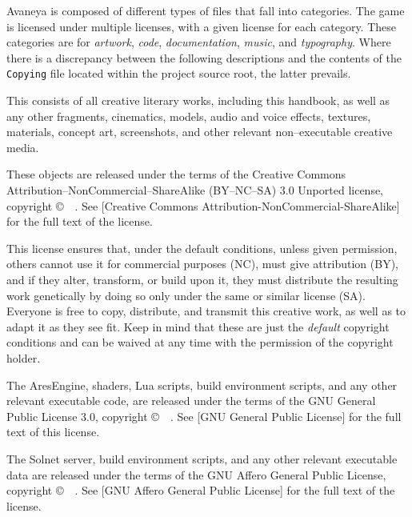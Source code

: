 

Avaneya is composed of different types of files that fall into categories. The game is licensed under multiple licenses, with a given license for each category. These categories are for {\it artwork}, {\it code}, {\it documentation}, {\it music}, and {\it typography}. Where there is a discrepancy between the following descriptions and the contents of the {\tt Copying} file located within the project source root, the latter prevails.

\startitemize[4]

This consists of all creative literary works, including this handbook, as well as any other fragments, cinematics, models, audio and voice effects, textures, materials, concept art, screenshots, and other relevant non--executable creative media. 

These objects are released under the terms of the Creative Commons Attribution--NonCommercial--ShareAlike (BY--NC--SA) 3.0 Unported license, copyright \copyright\ \CopyrightDates\ \CopyrightHolder. See [Creative Commons Attribution-NonCommercial-ShareAlike] for the full text of the license.

This license ensures that, under the default conditions, unless given permission, others cannot use it for commercial purposes (NC), must give attribution (BY), and if they alter, transform, or build upon it, they must distribute the resulting work genetically by doing so only under the same or similar license (SA). Everyone is free to copy, distribute, and transmit this creative work, as well as to adapt it as they see fit. Keep in mind that these are just the {\it default} copyright conditions and can be waived at any time with the permission of the copyright holder.


The AresEngine, shaders, Lua scripts, build environment scripts, and any other relevant executable code, are released under the terms of the GNU General Public License 3.0, copyright \copyright\ \CopyrightDates\ \CopyrightHolder. See [GNU General Public License] for the full text of this license.

The Solnet server, build environment scripts, and any other relevant executable data are released under the terms of the GNU Affero General Public License, copyright \copyright\ \CopyrightDates\ \CopyrightHolder. See [GNU Affero General Public License] for the full text of the license.

